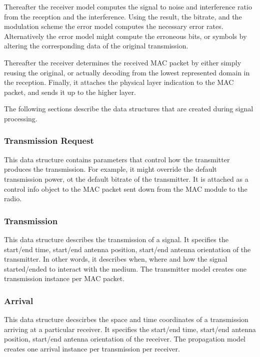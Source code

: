 Thereafter the receiver model computes the signal to noise and interference
ratio from the reception and the interference. Using the result, the bitrate,
and the modulation scheme the error model computes the necessary error rates.
Alternatively the error model might compute the erroneous bits, or symbols by
altering the corresponding data of the original transmission.

Thereafter the receiver determines the received MAC packet by either simply
reusing the original, or actually decoding from the lowest represented domain
in the reception. Finally, it attaches the physical layer indication to the MAC
packet, and sends it up to the higher layer.

The following sections describe the data structures that are created during
signal processing.

\subsubsection{Transmission Request}

This data structure contains parameters that control how the transmitter
produces the transmission. For example, it might override the default
transmission power, ot the default bitrate of the transmitter. It is attached as
a control info object to the MAC packet sent down from the MAC module to the
radio.

\subsubsection{Transmission}

This data structure describes the transmission of a signal. It specifies the
start/end time, start/end antenna position, start/end antenna orientation of the
transmitter. In other words, it describes when, where and how the signal
started/ended to interact with the medium. The transmitter model creates one
transmission instance per MAC packet.

\subsubsection{Arrival}

This data structure decscirbes the space and time coordinates of a transmission
arriving at a particular receiver. It specifies the start/end time, start/end
antenna position, start/end antenna orientation of the receiver. The propagation
model creates one arrival instance per transmission per receiver.


